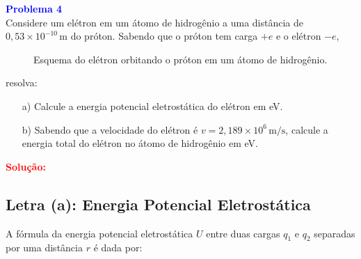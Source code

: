 \documentclass[a4paper,12pt]{article}
\begin{document}
\begin{flushleft}
\textbf{\textcolor{blue}{\Large Problema 4}}\\

Considere um elétron em um átomo de hidrogênio a uma distância de \( 0{,}53 \times 10^{-10} \, \text{m} \) do próton. 
Sabendo que o próton tem carga \( +e \) e o elétron \( -e \), 

\begin{figure}[h]
    \centering
    \caption{Esquema do elétron orbitando o próton em um átomo de hidrogênio.}
\end{figure}


resolva:

\begin{enumerate}
    \item[a)] Calcule a energia potencial eletrostática do elétron em eV.
    \item[b)] Sabendo que a velocidade do elétron é \( v = 2{,}189 \times 10^6 \, \text{m/s} \), 
    calcule a energia total do elétron no átomo de hidrogênio em eV.
\end{enumerate}

\textcolor{red}{\textbf{Solução:}}\\

\subsection*{Letra (a): Energia Potencial Eletrostática}

A fórmula da energia potencial eletrostática \( U \) entre duas cargas \( q_1 \) e \( q_2 \) separadas por uma distância \( r \) é dada por:


\end{flushleft}
\end{document}
